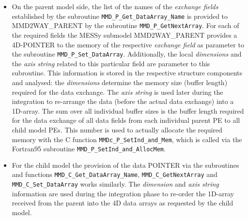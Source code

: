 \documentclass[twoside]{article}
\begin{document}
\begin{itemize}
\begin{itemize}
\begin{itemize}
\begin{itemize}
\item On the parent model side, the list 
of the names of the {\it exchange fields} established by the subroutine 
\verb|MMD_P_Get_DataArray_Name| is provided to MMD2WAY\_PARENT by the
subroutine \verb|MMD_P_GetNextArray|. For each of the required fields 
the MESSy submodel MMD2WAY\_PARENT provides a 4D-{\footnotesize POINTER} to the 
memory of the respective {\it exchange field}
as parameter to the subroutine \verb|MMD_P_Set_DataArray|. Additionally,
 the local {\it dimensions} and the {\it axis string} related to this particular
 field are parameter to this subroutine. This information is stored in the 
respective structure components and analysed: the {\it dimensions} determine the
 memory size (buffer length) required for the data exchange.
The {\it axis string} is used later during the integration to re-arrange the data 
(before the actual data exchange) into a 1D-array. The sum over all individual 
buffer sizes is the buffer length required for the data exchange of all data 
fields from each individual parent PE to all child model PEs. This number is
used to  
actually allocate the required memory with the C function 
\verb|MMDc_P_SetInd_and_Mem|, which is called via the Fortran95 subroutine 
\verb|MMD_P_SetInd_and_AllocMem|. 
\item For the child model the provision of the data {\footnotesize POINTER}
via the  
subroutines and functions \verb|MMD_C_Get_DataArray_Name|, 
\verb|MMD_C_GetNextArray| and  \verb|MMD_C_Set_DataArray| works similarly.
The {\it dimension} and {\it axis string} information are used during the 
integration phase to re-order the 1D-array received from the parent into the
4D data arrays as requested by the child model.
\end{itemize}


\end{itemize}
\end{itemize}
\end{itemize}
\end{document}
